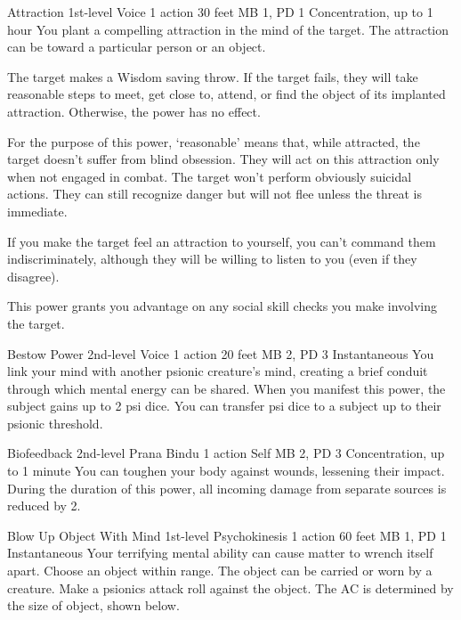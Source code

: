 \DndPowerHeader%
  {Attraction}
  {1st-level Voice}
  {1 action}
  {30 feet}
  {MB 1, PD 1}
  {Concentration, up to 1 hour}
You plant a compelling attraction in the mind of the target.
The attraction can be toward a particular person or an object.

The target makes a Wisdom saving throw.
If the target fails, they will take reasonable steps to meet,
get close to, attend, or find the object of its implanted attraction.
Otherwise, the power has no effect.

For the purpose of this power, `reasonable' means that, while attracted,
the target doesn't suffer from blind obsession.
They will act on this attraction only when not engaged in combat.
The target won't perform obviously suicidal actions.
They can still recognize danger but will not flee
unless the threat is immediate.

If you make the target feel an attraction to yourself,
you can't command them indiscriminately,
although they will be willing to listen to you (even if they disagree).

This power grants you advantage on any social skill checks
you make involving the target.

\DndPowerHeader%
  {Bestow Power}
  {2nd-level Voice}
  {1 action}
  {20 feet}
  {MB 2, PD 3}
  {Instantaneous}
You link your mind with another psionic creature's mind,
creating a brief conduit through which mental energy can be shared.
When you manifest this power,
the subject gains up to 2 psi dice.
You can transfer psi dice to a subject up to their psionic threshold.

\DndPowerHeader%
  {Biofeedback}
  {2nd-level Prana Bindu}
  {1 action}
  {Self}
  {MB 2, PD 3}
  {Concentration, up to 1 minute}
    You can toughen your body against wounds,
    lessening their impact.
    During the duration of this power, all incoming damage
    from separate sources is reduced by 2.

\DndPowerHeader%
  {Blow Up Object With Mind}
  {1st-level Psychokinesis}
  {1 action}
  {60 feet}
  {MB 1, PD 1}
  {Instantaneous}
Your terrifying mental ability can cause matter to
wrench itself apart. 
Choose an object within range.
The object can be carried or worn by a creature.
Make a psionics attack roll against the object.
The AC is determined by the size of object, shown below.

